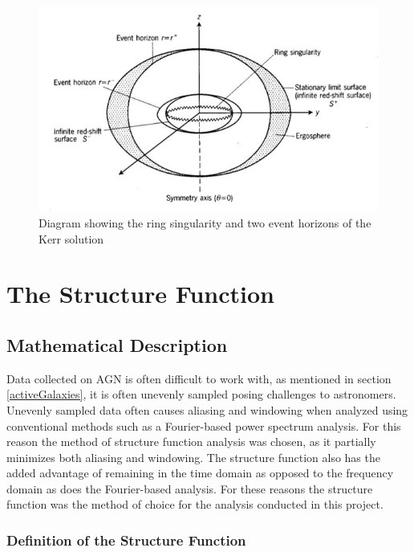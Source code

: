 \documentclass[12pt, oneside]{smuthesis}
\begin{document}
\begin{figure}
	\centering
	\includegraphics[width=0.9\linewidth]{KerrHorizons}
	\caption{Diagram showing the ring singularity and two event horizons of the Kerr solution \citep{dinverno}}
	\label{fig:kerrHorizons}
\end{figure}

\chapter{\sc The Structure Function} \label{structureFunction}

\section{\sc Mathematical Description} \label{mathematicalDesc}

Data collected on AGN is often difficult to work with, as mentioned in section \ref{activeGalaxies}, it is often unevenly sampled posing challenges to astronomers. Unevenly sampled data often causes aliasing and windowing when analyzed using conventional methods such as a Fourier-based power spectrum analysis. For this reason the method of structure function analysis was chosen, as it partially minimizes both aliasing and windowing. The structure function also has the added advantage of remaining in the time domain as opposed to the frequency domain as does the Fourier-based analysis. For these reasons the structure function was the method of choice for the analysis conducted in this project.

\subsection{\sc Definition of the Structure Function} \label{structureFunctionDefinition}
\end{document}
